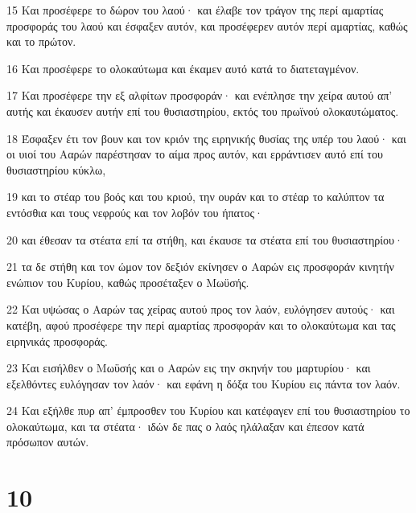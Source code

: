 \par 15 Και προσέφερε το δώρον του λαού· και έλαβε τον τράγον της περί αμαρτίας προσφοράς του λαού και έσφαξεν αυτόν, και προσέφερεν αυτόν περί αμαρτίας, καθώς και το πρώτον.
\par 16 Και προσέφερε το ολοκαύτωμα και έκαμεν αυτό κατά το διατεταγμένον.
\par 17 Και προσέφερε την εξ αλφίτων προσφοράν· και ενέπλησε την χείρα αυτού απ' αυτής και έκαυσεν αυτήν επί του θυσιαστηρίου, εκτός του πρωϊνού ολοκαυτώματος.
\par 18 Έσφαξεν έτι τον βουν και τον κριόν της ειρηνικής θυσίας της υπέρ του λαού· και οι υιοί του Ααρών παρέστησαν το αίμα προς αυτόν, και ερράντισεν αυτό επί του θυσιαστηρίου κύκλω,
\par 19 και το στέαρ του βοός και του κριού, την ουράν και το στέαρ το καλύπτον τα εντόσθια και τους νεφρούς και τον λοβόν του ήπατος·
\par 20 και έθεσαν τα στέατα επί τα στήθη, και έκαυσε τα στέατα επί του θυσιαστηρίου·
\par 21 τα δε στήθη και τον ώμον τον δεξιόν εκίνησεν ο Ααρών εις προσφοράν κινητήν ενώπιον του Κυρίου, καθώς προσέταξεν ο Μωϋσής.
\par 22 Και υψώσας ο Ααρών τας χείρας αυτού προς τον λαόν, ευλόγησεν αυτούς· και κατέβη, αφού προσέφερε την περί αμαρτίας προσφοράν και το ολοκαύτωμα και τας ειρηνικάς προσφοράς.
\par 23 Και εισήλθεν ο Μωϋσής και ο Ααρών εις την σκηνήν του μαρτυρίου· και εξελθόντες ευλόγησαν τον λαόν· και εφάνη η δόξα του Κυρίου εις πάντα τον λαόν.
\par 24 Και εξήλθε πυρ απ' έμπροσθεν του Κυρίου και κατέφαγεν επί του θυσιαστηρίου το ολοκαύτωμα, και τα στέατα· ιδών δε πας ο λαός ηλάλαξαν και έπεσον κατά πρόσωπον αυτών.

\chapter{10}

